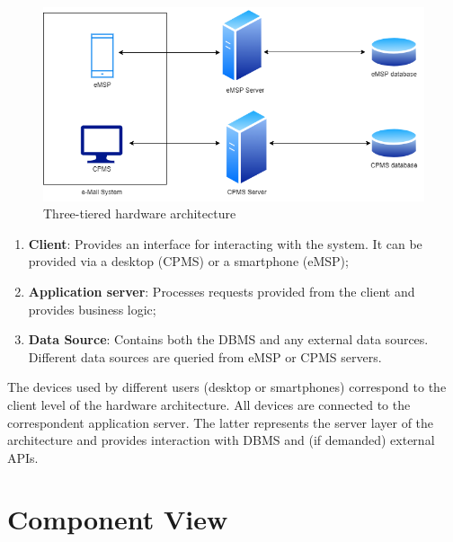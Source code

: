 \documentclass[12pt]{report}
\begin{document}
\begin{figure}[ht]
    \centering
    \includegraphics[width =\textwidth]{assets/high_level_system.drawio.png}
    \caption{Three-tiered hardware architecture}
    \label{fig:my_label0}
\end{figure}

\newpage
\bigskip
\begin{enumerate}[T1:] 
    \item\textbf{Client}: Provides an interface for interacting with the system. It can be provided via a desktop (CPMS) or a smartphone (eMSP);
    \item\textbf{Application server}: Processes requests provided from the client and provides business logic;
    \item\textbf{Data Source}: Contains both the DBMS and any external data sources. Different data sources are queried from eMSP or CPMS servers.
\end{enumerate}

\noindent The devices used by different users (desktop or smartphones) correspond to the client level of the hardware architecture. All devices are connected to the correspondent application server. The latter represents the server layer of the architecture and provides interaction with DBMS and (if demanded) external APIs.

\section{Component View}
\end{document}
